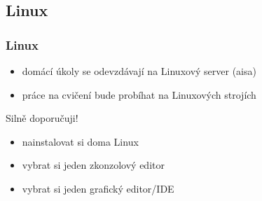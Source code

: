 \subsection{Linux}

\begin{frame}
	\frametitle{Linux}
	\begin{itemize}
		\item{domácí úkoly se odevzdávají na Linuxový server (aisa)}
		\item{práce na cvičení bude probíhat na Linuxových strojích}
	\end{itemize}
	\begin{block}{Silně doporučuji!}
		\begin{itemize}
		\item{nainstalovat si doma Linux}
		\item{vybrat si jeden zkonzolový editor}
		\item{vybrat si jeden grafický editor/IDE}
		\end{itemize}
	\end{block}
\end{frame}






